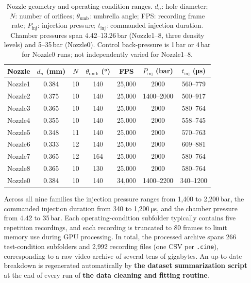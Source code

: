 \documentclass[english, 12pt, a4paper, elec, utf8, a-2b, online]{aaltothesis}
\begin{document}
\begin{table}[t]
\centering
\footnotesize
\setlength{\tabcolsep}{4pt}
\renewcommand{\arraystretch}{1.1}
\begin{tabular}{@{}lcccccc@{}}
\toprule
Nozzle & $d_n$ (mm) & $N$ & $\theta_{\mathrm{umb}}$ (°) & FPS & $P_{\mathrm{inj}}$ (bar) & $t_{\mathrm{inj}}$ (\si{\micro s}) \\
\midrule
Nozzle1 & 0.384 & 10 & 140 & 25{,}000 & 2000          & 560--779   \\
Nozzle2 & 0.375 & 10 & 140 & 25{,}000 & 1400--2000    & 500--917   \\
Nozzle3 & 0.365 & 10 & 140 & 25{,}000 & 2000          & 580--764   \\
Nozzle4 & 0.355 & 10 & 140 & 25{,}000 & 2000          & 558--745   \\
Nozzle5 & 0.348 & 11 & 140 & 25{,}000 & 2000          & 570--763   \\
Nozzle6 & 0.333 & 12 & 140 & 25{,}000 & 2000          & 609--881   \\
Nozzle7 & 0.365 & 12 & 164 & 25{,}000 & 2000          & 580--764   \\
Nozzle8 & 0.365 & 10 & 130 & 25{,}000 & 2000          & 580--764   \\
Nozzle0   & 0.384 & 10 & 140 & 34{,}000 & 1400--2200    & 340--1200  \\
\bottomrule
\end{tabular}
\caption{Nozzle geometry and operating-condition ranges. $d_n$: hole diameter; $N$: number of orifices; $\theta_{\mathrm{umb}}$: umbrella angle; FPS: recording frame rate; $P_{\mathrm{inj}}$: injection pressure; $t_{\mathrm{inj}}$: commanded injection duration. Chamber pressures span 4.42--13.26\,bar (Nozzle1--8, three density levels) and 5--35\,bar (Nozzle0). Control back-pressure is 1\,bar or 4\,bar for Nozzle0 runs; not independently varied for Nozzle1--8.}
\label{tab:nozzle-overview}
\end{table}

Across all nine families the injection pressure ranges from 1,400 to 2,200\,bar,
the commanded injection duration from 340 to 1,200\,\si{\micro s},
and the chamber pressure from 4.42 to 35\,bar.
Each operating-condition subfolder typically contains five repetition recordings,
and each recording is truncated to 80 frames to limit memory use during GPU processing.
In total, the processed archive spans 266 test-condition subfolders and 2,992 recording files
(one CSV per \texttt{.cine}), corresponding to a raw video archive of several tens of gigabytes.
An up-to-date breakdown is regenerated automatically by \textbf{the dataset summarization script}
at the end of every run of \textbf{the data cleaning and fitting routine}.
\end{document}
